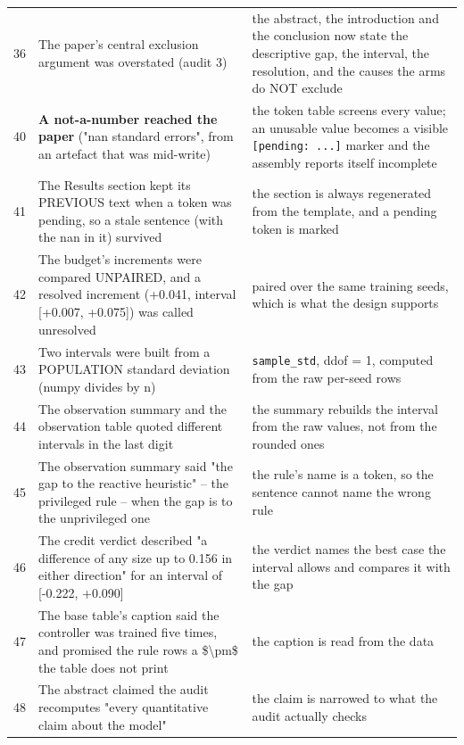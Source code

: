 \documentclass[11pt,a4paper]{article}
\begin{document}
\begin{longtable}{@{}>{\raggedleft\arraybackslash}p{0.7cm}>{\raggedright\arraybackslash}p{6.1cm}>{\raggedright\arraybackslash}p{8.55cm}@{}}
\rowcolor{uavzebra}
\textcolor{uavmuted}{36} & The paper's central exclusion argument was overstated (audit 3) & the abstract, the introduction and the conclusion now state the descriptive gap, the interval, the resolution, and the causes the arms do NOT exclude \\
\textcolor{uavmuted}{40} & \textbf{A not-a-number reached the paper} ("nan standard errors", from an artefact that was mid-write) & the token table screens every value; an unusable value becomes a visible \texttt{[pending: ...]} marker and the assembly reports itself incomplete \\
\rowcolor{uavzebra}
\textcolor{uavmuted}{41} & The Results section kept its PREVIOUS text when a token was pending, so a stale sentence (with the nan in it) survived & the section is always regenerated from the template, and a pending token is marked \\
\textcolor{uavmuted}{42} & The budget's increments were compared UNPAIRED, and a resolved increment (+0.041, interval [+0.007, +0.075]) was called unresolved & paired over the same training seeds, which is what the design supports \\
\rowcolor{uavzebra}
\textcolor{uavmuted}{43} & Two intervals were built from a POPULATION standard deviation (numpy divides by n) & \texttt{sample\_std}, ddof = 1, computed from the raw per-seed rows \\
\textcolor{uavmuted}{44} & The observation summary and the observation table quoted different intervals in the last digit & the summary rebuilds the interval from the raw values, not from the rounded ones \\
\rowcolor{uavzebra}
\textcolor{uavmuted}{45} & The observation summary said "the gap to the reactive heuristic" -- the privileged rule -- when the gap is to the unprivileged one & the rule's name is a token, so the sentence cannot name the wrong rule \\
\textcolor{uavmuted}{46} & The credit verdict described "a difference of any size up to 0.156 in either direction" for an interval of [-0.222, +0.090] & the verdict names the best case the interval allows and compares it with the gap \\
\rowcolor{uavzebra}
\textcolor{uavmuted}{47} & The base table's caption said the controller was trained five times, and promised the rule rows a \$\textbackslash{}\allowbreak{}pm\$ the table does not print & the caption is read from the data \\
\textcolor{uavmuted}{48} & The abstract claimed the audit recomputes "every quantitative claim about the model" & the claim is narrowed to what the audit actually checks \\

\end{longtable}
\end{document}
